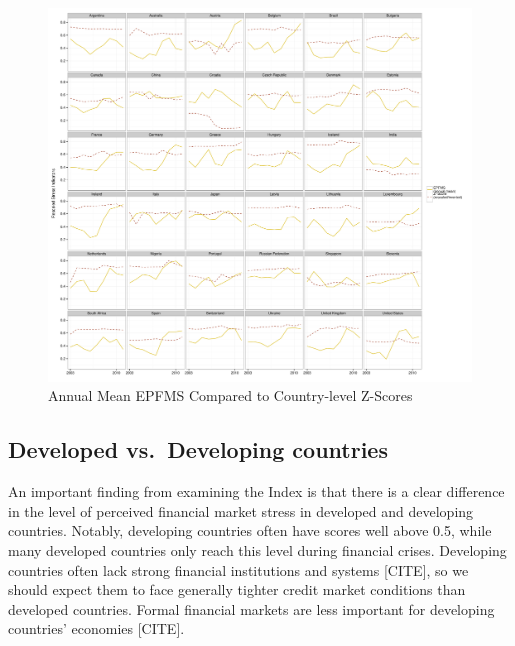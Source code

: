 \documentclass[]{article}
\begin{document}
\begin{landscape}
\begin{figure}

    \caption{Annual Mean EPFMS Compared to Country-level Z-Scores}
    \label{z_score}

    \begin{center}
        \includegraphics[scale=0.4]{analysis/figures/compare_to_z-score.pdf}
    \end{center}

\end{figure}
\end{landscape}

\subsection{Developed vs.~Developing
countries}\label{developed-vs.developing-countries}

An important finding from examining the Index is that there is a clear
difference in the level of perceived financial market stress in
developed and developing countries. Notably, developing countries often
have scores well above 0.5, while many developed countries only reach
this level during financial crises. Developing countries often lack
strong financial institutions and systems {[}CITE{]}, so we should
expect them to face generally tighter credit market conditions than
developed countries. Formal financial markets are less important for
developing countries' economies {[}CITE{]}.
\end{document}
